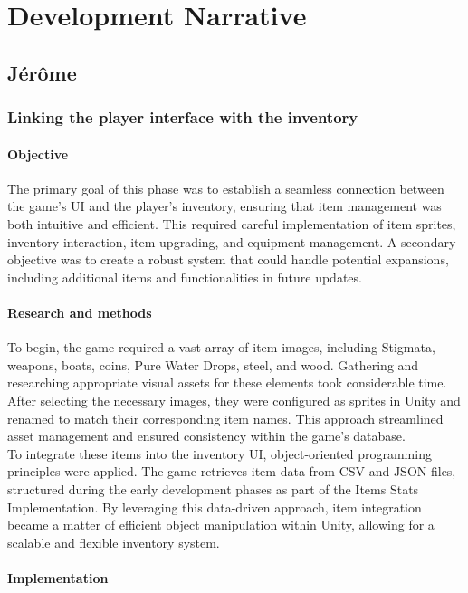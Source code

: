 \documentclass{article}
\begin{document}
\newpage
\section{Development Narrative}
\subsection{Jérôme}
\subsubsection{Linking the player interface with the inventory}
\paragraph{Objective}\hfill

The primary goal of this phase was to establish a seamless connection between the game's UI and the player's inventory, ensuring that item management was both intuitive and efficient. This required careful implementation of item sprites, inventory interaction, item upgrading, and equipment management. A secondary objective was to create a robust system that could handle potential expansions, including additional items and functionalities in future updates.

\paragraph{Research and methods}\hfill

To begin, the game required a vast array of item images, including Stigmata, weapons, boats, coins, Pure Water Drops, steel, and wood. Gathering and researching appropriate visual assets for these elements took considerable time. After selecting the necessary images, they were configured as sprites in Unity and renamed to match their corresponding item names. This approach streamlined asset management and ensured consistency within the game's database.\\

To integrate these items into the inventory UI, object-oriented programming principles were applied. The game retrieves item data from CSV and JSON files, structured during the early development phases as part of the Items Stats Implementation. By leveraging this data-driven approach, item integration became a matter of efficient object manipulation within Unity, allowing for a scalable and flexible inventory system.

\paragraph{Implementation}\hfill
\end{document}

